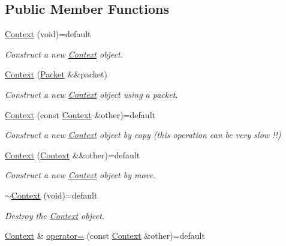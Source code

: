 \subsection*{Public Member Functions}
\begin{DoxyCompactItemize}
\item 
\mbox{\hyperlink{classo_z_1_1_context_af3aab1b32d4333320612049bdafb07d7}{Context}} (void)=default
\begin{DoxyCompactList}\small\item\em Construct a new \mbox{\hyperlink{classo_z_1_1_context}{Context}} object. \end{DoxyCompactList}\item 
\mbox{\hyperlink{classo_z_1_1_context_aa57df3d21eacc6e149f9c61c0c3f196b}{Context}} (\mbox{\hyperlink{classo_z_1_1_packet}{Packet}} \&\&packet)
\begin{DoxyCompactList}\small\item\em Construct a new \mbox{\hyperlink{classo_z_1_1_context}{Context}} object using a packet. \end{DoxyCompactList}\item 
\mbox{\hyperlink{classo_z_1_1_context_a906eb29f22e89bc121c47096c7a4b601}{Context}} (const \mbox{\hyperlink{classo_z_1_1_context}{Context}} \&other)=default
\begin{DoxyCompactList}\small\item\em Construct a new \mbox{\hyperlink{classo_z_1_1_context}{Context}} object by copy (this operation can be very slow !!) \end{DoxyCompactList}\item 
\mbox{\hyperlink{classo_z_1_1_context_ad4a49704266f6e8312b1c9c2ca8ad710}{Context}} (\mbox{\hyperlink{classo_z_1_1_context}{Context}} \&\&other)=default
\begin{DoxyCompactList}\small\item\em Construct a new \mbox{\hyperlink{classo_z_1_1_context}{Context}} object by move. \end{DoxyCompactList}\item 
\mbox{\hyperlink{classo_z_1_1_context_afe2e01a552a7711772e4028f778703e8}{$\sim$\+Context}} (void)=default
\begin{DoxyCompactList}\small\item\em Destroy the \mbox{\hyperlink{classo_z_1_1_context}{Context}} object. \end{DoxyCompactList}\item 
\mbox{\hyperlink{classo_z_1_1_context}{Context}} \& \mbox{\hyperlink{classo_z_1_1_context_a85f1c7d649bb381f267383360b02b876}{operator=}} (const \mbox{\hyperlink{classo_z_1_1_context}{Context}} \&other)=default

\end{DoxyCompactItemize}
